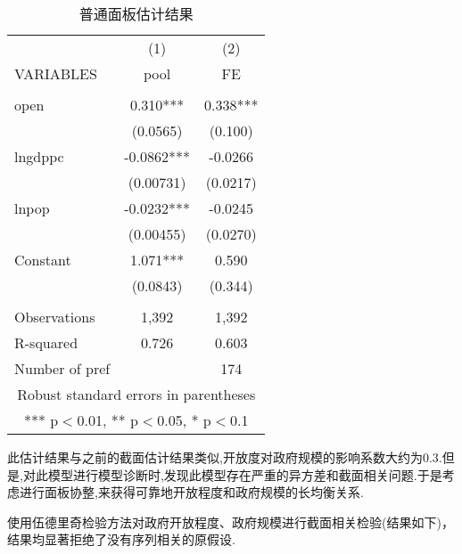 \documentclass[10pt]{article}
\begin{document}
    \begin{table}[ht]
        \begin{center}
            \caption{普通面板估计结果} \label{tb:panel}
            \begin{tabular}{lcc} \hline \hline
                 & (1) & (2) \\
                VARIABLES & pool & FE \\ \hline
                 &  &  \\
                open & 0.310*** & 0.338*** \\
                 & (0.0565) & (0.100) \\
                lngdppc & -0.0862*** & -0.0266 \\
                 & (0.00731) & (0.0217) \\
                lnpop & -0.0232*** & -0.0245 \\
                 & (0.00455) & (0.0270) \\
                Constant & 1.071*** & 0.590 \\
                 & (0.0843) & (0.344) \\
                 &  &  \\
                Observations & 1,392 & 1,392 \\
                R-squared & 0.726 & 0.603 \\
                 Number of pref &  & 174 \\ \hline \hline
                \multicolumn{3}{c}{ Robust standard errors in parentheses} \\
                \multicolumn{3}{c}{ *** p$<$0.01, ** p$<$0.05, * p$<$0.1} \\
            \end{tabular}
        \end{center}
    \end{table}

    此估计结果与之前的截面估计结果类似,开放度对政府规模的影响系数大约为0.3.但是,对此模型进行模型诊断时,发现此模型存在严重的异方差和截面相关问题.于是考虑进行面板协整,来获得可靠地开放程度和政府规模的长均衡关系.

    使用伍德里奇检验方法\cite{wooldridge2010econometric}对政府开放程度、政府规模进行截面相关检验(结果如下)，结果均显著拒绝了没有序列相关的原假设.
\end{document}
